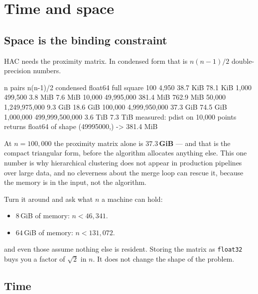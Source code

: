 \documentclass[11pt]{article}
\begin{document}
\section{Time and space}
\label{sec:cost}

\subsection{Space is the binding constraint}

HAC needs the proximity matrix. In condensed form that is $n(n-1)/2$
double-precision numbers.

\begin{codeout}
        n        pairs n(n-1)/2   condensed float64      full square
      100                4,950           38.7 KiB         78.1 KiB
    1,000              499,500            3.8 MiB          7.6 MiB
   10,000           49,995,000          381.4 MiB        762.9 MiB
   50,000        1,249,975,000            9.3 GiB         18.6 GiB
  100,000        4,999,950,000           37.3 GiB         74.5 GiB
1,000,000      499,999,500,000            3.6 TiB          7.3 TiB
measured: pdist on 10,000 points returns float64 of shape (49995000,) -> 381.4 MiB
\end{codeout}

\begin{keyidea}
At $n = 100{,}000$ the proximity matrix alone is $\mathbf{37.3}$\,\textbf{GiB}
--- and that is the compact triangular form, before the algorithm allocates
anything else. This one number is why hierarchical clustering does not appear
in production pipelines over large data, and no cleverness about the merge
loop can rescue it, because the memory is in the input, not the algorithm.
\end{keyidea}

Turn it around and ask what $n$ a machine can hold:

\begin{itemize}[leftmargin=*]
  \item $8$\,GiB of memory: $n < 46{,}341$.
  \item $64$\,GiB of memory: $n < 131{,}072$.
\end{itemize}

and even those assume nothing else is resident. Storing the matrix as
\texttt{float32} buys you a factor of $\sqrt{2}$ in $n$. It does not change
the shape of the problem.

\subsection{Time}
\end{document}

